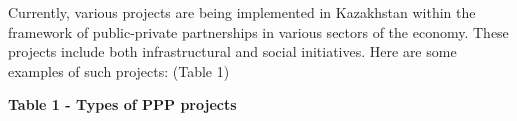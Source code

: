 Currently, various projects are being implemented in Kazakhstan within
the framework of public-private partnerships in various sectors of the
economy. These projects include both infrastructural and social
initiatives. Here are some examples of such projects: (Table 1)

{\bfseries Table 1 - Types of PPP projects}

